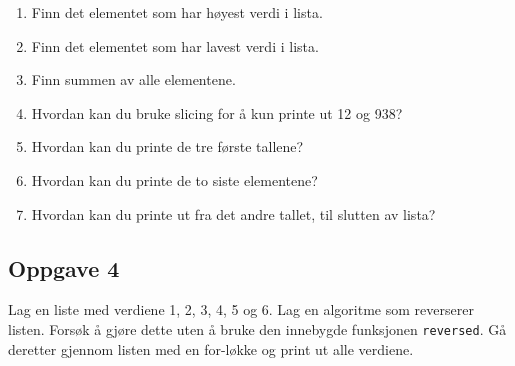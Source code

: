 \documentclass{article}
\begin{document}
\begin{enumerate}
    \item Finn det elementet som har høyest verdi i lista.
     \item Finn det elementet som har lavest verdi i lista.
      \item Finn summen av alle elementene.
      \item Hvordan kan du bruke slicing for å kun printe ut 12 og 938?
      \item Hvordan kan du printe de tre første tallene?
      \item Hvordan kan du printe de to siste elementene?
      \item Hvordan kan du printe ut fra det andre tallet, til slutten av lista?
\end{enumerate}


\subsection*{Oppgave 4}
Lag en liste med verdiene 1, 2, 3, 4, 5 og 6. Lag en algoritme som reverserer listen. Forsøk å gjøre dette uten å bruke den innebygde funksjonen \texttt{reversed}. Gå deretter gjennom listen med en for-løkke og print ut alle verdiene.
\end{document}
